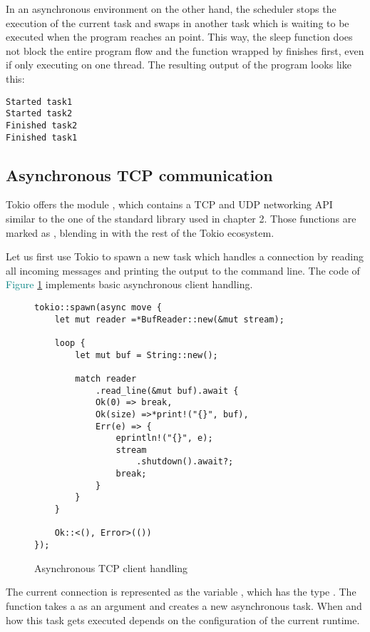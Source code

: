 In an asynchronous environment on the other hand, the scheduler stops the execution of the current task and swaps in
another task which is waiting to be executed when the program reaches an  point. This way, the sleep
function does not block the entire program flow and the function wrapped by  finishes first, even if only
executing on one thread. The resulting output of the program looks like this:

\begin{verbatim}
Started task1
Started task2
Finished task2
Finished task1
\end{verbatim}

\subsection{Asynchronous TCP communication}
Tokio offers the module , which contains a TCP and UDP networking API similar to the one of the
standard library used in chapter 2. Those functions are marked as , blending in with the rest of the Tokio
ecosystem.

Let us first use Tokio to spawn a new task which handles a connection by reading all incoming messages and printing the
output to the command line. The code of \textcolor{teal}{Figure \ref{async-tcp-client-handeling}} implements basic
asynchronous client handling.

\begin{figure}[ht]
    \begin{verbatim}
tokio::spawn(async move {
    let mut reader =*BufReader::new(&mut stream);

    loop {
        let mut buf = String::new();

        match reader
            .read_line(&mut buf).await {
            Ok(0) => break,
            Ok(size) =>*print!("{}", buf),
            Err(e) => {
                eprintln!("{}", e);
                stream
                    .shutdown().await?;
                break;
            }
        }
    }

    Ok::<(), Error>(())
});
    \end{verbatim}
    \caption{Asynchronous TCP client handling}
    \label{async-tcp-client-handeling}
\end{figure}

The current connection is represented as the variable , which has the type .
The function  takes a  as an argument and creates a new asynchronous task. When and how
this task gets executed depends on the configuration of the current runtime.

